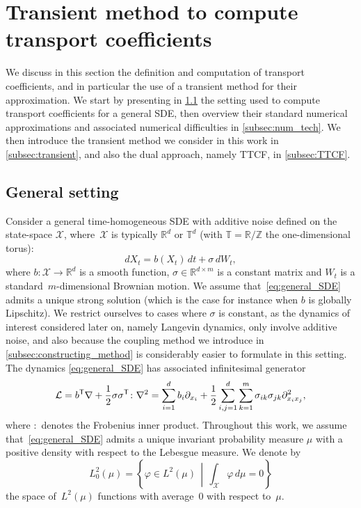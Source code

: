 \documentclass[11pt]{article}
\newcommand{\T}{\mathbb{T}}
\newcommand{\Z}{\mathbb{Z}}
\newcommand{\R}{\mathbb{R}}
\newcommand{\X}{\mathcal{X}}
\renewcommand{\L}{\mathcal{L}}
\renewcommand{\t}{\mathsf T}
\theoremstyle{definition}
\begin{document}
\section{Transient method to compute transport coefficients}
\label{sec:trans_coeff}
We discuss in this section the definition and computation of transport coefficients, and in particular the use of a transient method for their approximation. We start by presenting in \cref{subsec:gen_setting} the setting used to compute transport coefficients for a general SDE, then overview their standard numerical approximations and associated numerical difficulties in \cref{subsec:num_tech}. We then introduce the transient method we consider in this work in \cref{subsec:transient}, and also the dual approach, namely TTCF, in \cref{subsec:TTCF}. 

\subsection{General setting}
\label{subsec:gen_setting}
Consider a general time-homogeneous SDE with additive noise defined on the state-space $\mathcal{X}$, where~$\mathcal{X}$ is typically $\R^d$ or $\T^d$ (with $\T = \R/\Z$ the one-dimensional torus):
\begin{equation}
    dX_t = b(X_t) \, dt + \sigma \, dW_t,
    \label{eq:general_SDE}
\end{equation}
where $b\colon \mathcal{X} \to \R^d$ is a smooth function, $\sigma \in \R^{d\times m}$ is a constant matrix and $W_t$ is a standard~$m$-dimensional Brownian motion. We assume that~\eqref{eq:general_SDE} admits a unique strong solution (which is the case for instance when $b$ is globally Lipschitz). We restrict ourselves to cases where $\sigma$ is constant, as the dynamics of interest considered later on, namely Langevin dynamics, only involve additive noise, and also because the coupling method we introduce in \cref{subsec:constructing_method} is considerably easier to formulate in this setting. The dynamics \eqref{eq:general_SDE} has associated infinitesimal generator
\begin{equation}
    \notag
    \L = b^\t\nabla + \frac{1}{2}\sigma\sigma^\t \colon \nabla^2 = \sum_{i=1}^d b_i\partial_{x_i} + \frac{1}{2}\sum_{i,j=1}^d\sum_{k=1}^m \sigma_{ik}\sigma_{jk} \partial_{x_ix_j}^2,
\end{equation}
where $\colon$ denotes the Frobenius inner product. Throughout this work, we assume that~\eqref{eq:general_SDE} admits a unique invariant probability measure $\mu$ with a positive density with respect to the Lebesgue measure. 
We denote by 
\[
L^2_0(\mu) = \left\{\varphi \in L^2(\mu) \, \middle| \, \int_\X \varphi \, d\mu = 0\right\}
\]
the space of~$L^2(\mu)$ functions with average~0 with respect to~$\mu$.
\end{document}
